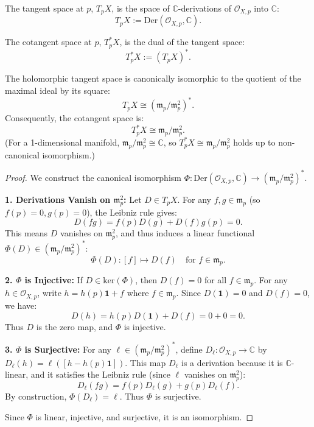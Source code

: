 \documentclass{article}
\begin{document}
\begin{definition}
The tangent space at $p$, $T_p X$, is the space of $\mathbb{C}$-derivations of $\mathcal{O}_{X,p}$ into $\mathbb{C}$:
$$ T_p X := \mathrm{Der}(\mathcal{O}_{X,p}, \mathbb{C}). $$
\end{definition}

\begin{definition}
The cotangent space at $p$, $T_p^* X$, is the dual of the tangent space:
$$ T_p^* X := (T_p X)^*. $$
\end{definition}

\begin{lemma}
The holomorphic tangent space is canonically isomorphic to the quotient of the maximal ideal by its square:
$$ T_p X \cong (\mathfrak{m}_p / \mathfrak{m}_p^2)^*. $$
Consequently, the cotangent space is:
$$ T_p^* X \cong \mathfrak{m}_p / \mathfrak{m}_p^2. $$
(For a 1-dimensional manifold, $\mathfrak{m}_p / \mathfrak{m}_p^2 \cong \mathbb{C}$, so $T_p^* X \cong \mathfrak{m}_p / \mathfrak{m}_p^2$ holds up to non-canonical isomorphism.)
\end{lemma}

\begin{proof}
We construct the canonical isomorphism $\Phi: \mathrm{Der}(\mathcal{O}_{X,p}, \mathbb{C}) \to (\mathfrak{m}_p / \mathfrak{m}_p^2)^*$.

\textbf{1. Derivations Vanish on $\mathfrak{m}_p^2$:}
Let $D \in T_p X$. For any $f, g \in \mathfrak{m}_p$ (so $f(p)=0, g(p)=0$), the Leibniz rule gives:
$$ D(fg) = f(p)D(g) + D(f)g(p) = 0. $$
This means $D$ vanishes on $\mathfrak{m}_p^2$, and thus induces a linear functional $\Phi(D) \in (\mathfrak{m}_p / \mathfrak{m}_p^2)^*$:
$$ \Phi(D): [f] \mapsto D(f) \quad \text{for } f \in \mathfrak{m}_p. $$

\textbf{2. $\Phi$ is Injective:}
If $D \in \mathrm{ker}(\Phi)$, then $D(f)=0$ for all $f \in \mathfrak{m}_p$. For any $h \in \mathcal{O}_{X,p}$, write $h = h(p)\mathbf{1} + f$ where $f \in \mathfrak{m}_p$. Since $D(\mathbf{1})=0$ and $D(f)=0$, we have:
$$ D(h) = h(p)D(\mathbf{1}) + D(f) = 0 + 0 = 0. $$
Thus $D$ is the zero map, and $\Phi$ is injective.

\textbf{3. $\Phi$ is Surjective:}
For any $\ell \in (\mathfrak{m}_p / \mathfrak{m}_p^2)^*$, define $D_\ell: \mathcal{O}_{X,p} \to \mathbb{C}$ by $D_\ell(h) = \ell([h - h(p)\mathbf{1}])$. This map $D_\ell$ is a derivation because it is $\mathbb{C}$-linear, and it satisfies the Leibniz rule (since $\ell$ vanishes on $\mathfrak{m}_p^2$):
$$ D_\ell(fg) = f(p)D_\ell(g) + g(p)D_\ell(f). $$
By construction, $\Phi(D_\ell) = \ell$. Thus $\Phi$ is surjective.

Since $\Phi$ is linear, injective, and surjective, it is an isomorphism.
\end{proof}
\end{document}
